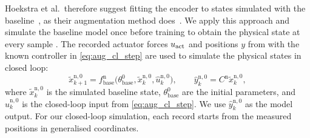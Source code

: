 Hoekstra et al.\ therefore suggest fitting the encoder to 
states simulated with the 
baseline~\cite[Sec.~3.2, Eq.~(35)]{hoekstra2026encoder}, as their 
augmentation method does~\cite[Sec.~5.4.2]{hoekstra2026lfr}.
We apply this approach and simulate the baseline model once before training 
to obtain the physical state at every sample .
The recorded actuator forces $u_{\mathrm{act}}$ and positions $y$
from  with the known controller in
\eqref{eq:aug_cl_step} are used to simulate the physical states in closed loop:
\begin{equation}
 \tilde x^{\mathrm n,0}_{k+1}=f^{\mathrm n}_{\mathrm{base}}\bigl(\theta^0_{\mathrm{base}},
   \tilde x^{\mathrm n,0}_k,\hat u^{\mathrm n,0}_k\bigr),\qquad
 \hat y^{\mathrm n,0}_k=C^{\mathrm n}\tilde x^{\mathrm n,0}_k,
 \label{eq:aug_enc_sim}
\end{equation}
where $\tilde x^{\mathrm n,0}_k$ is the simulated baseline state,
$\theta^0_{\mathrm{base}}$ are the initial parameters,
and $\hat u^{\mathrm n,0}_k$ is the closed-loop input
from \eqref{eq:aug_cl_step}.
We use $\hat y^{\mathrm n,0}_k$ as the model output.
For our closed-loop simulation, each record starts from the measured
positions in generalised coordinates.
%
